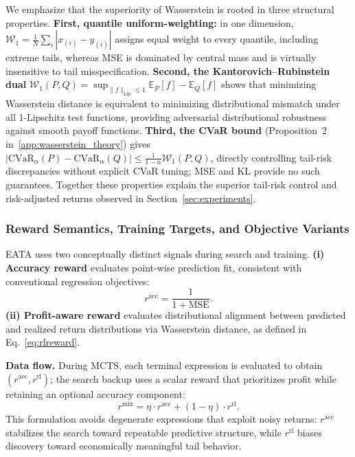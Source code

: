 We emphasize that the superiority of Wasserstein is rooted in three structural properties. \textbf{First, quantile uniform-weighting:} in one dimension, $\mathcal{W}_1 = \frac{1}{N}\sum_i |x_{(i)} - y_{(i)}|$ assigns equal weight to every quantile, including extreme tails, whereas MSE is dominated by central mass and is virtually insensitive to tail misspecification. \textbf{Second, the Kantorovich--Rubinstein dual} $\mathcal{W}_1(P,Q) = \sup_{\|f\|_{\text{Lip}} \leq 1} \mathbb{E}_{P}[f] - \mathbb{E}_{Q}[f]$ shows that minimizing Wasserstein distance is equivalent to minimizing distributional mismatch under all 1-Lipschitz test functions, providing adversarial distributional robustness against smooth payoff functions. \textbf{Third, the CVaR bound} (Proposition~2 in~\ref{app:wasserstein_theory}) gives $|\text{CVaR}_\alpha(P) - \text{CVaR}_\alpha(Q)| \leq \frac{1}{1-\alpha}\mathcal{W}_1(P,Q)$, directly controlling tail-risk discrepancies without explicit CVaR tuning; MSE and KL provide no such guarantees. Together these properties explain the superior tail-risk control and risk-adjusted returns observed in Section~\ref{sec:experiments}.

\subsubsection{Reward Semantics, Training Targets, and Objective Variants}
\label{subsec:reward_flow}

EATA uses two conceptually distinct signals during search and training.
\textbf{(i) Accuracy reward} evaluates point-wise prediction fit, consistent with conventional regression objectives:
\begin{equation}
r^{\text{acc}} = \frac{1}{1 + \text{MSE}}.
\label{eq:racc}
\end{equation}
\textbf{(ii) Profit-aware reward} evaluates distributional alignment between predicted and realized return distributions via Wasserstein distance, as defined in Eq.~\ref{eq:rlreward}.

\textbf{Data flow.} During MCTS, each terminal expression is evaluated to obtain $(r^{\text{acc}}, r^{\text{rl}})$; the search backup uses a scalar reward that prioritizes profit while retaining an optional accuracy component:
\begin{equation}
r^{\text{mix}} = \eta \cdot r^{\text{acc}} + (1-\eta) \cdot r^{\text{rl}}.
\label{eq:rmix}
\end{equation}
This formulation avoids degenerate expressions that exploit noisy returns: $r^{\text{acc}}$ stabilizes the search toward repeatable predictive structure, while $r^{\text{rl}}$ biases discovery toward economically meaningful tail behavior.


